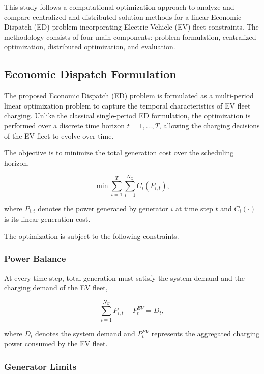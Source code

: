 \documentclass[12pt, a4paper]{article}
\begin{document}
%
This study follows a computational optimization approach to analyze and compare centralized and distributed solution methods for a linear Economic Dispatch (ED) problem incorporating Electric Vehicle (EV) fleet constraints. The methodology consists of four main components: problem formulation, centralized optimization, distributed optimization, and evaluation.

\subsection{Economic Dispatch Formulation}

The proposed Economic Dispatch (ED) problem is formulated as a multi-period linear optimization problem to capture the temporal characteristics of EV fleet charging. Unlike the classical single-period ED formulation, the optimization is performed over a discrete time horizon $t = 1,\ldots,T$, allowing the charging decisions of the EV fleet to evolve over time.

The objective is to minimize the total generation cost over the scheduling horizon,

\begin{equation}
\min \sum_{t=1}^{T}\sum_{i=1}^{N_G} C_i(P_{i,t}),
\end{equation}

where $P_{i,t}$ denotes the power generated by generator $i$ at time step $t$ and $C_i(\cdot)$ is its linear generation cost.

The optimization is subject to the following constraints.

\subsubsection*{Power Balance}

At every time step, total generation must satisfy the system demand and the charging demand of the EV fleet,

\begin{equation}
\sum_{i=1}^{N_G} P_{i,t}
-
P^{EV}_{t}
=
D_t,
\end{equation}

where $D_t$ denotes the system demand and $P^{EV}_{t}$ represents the aggregated charging power consumed by the EV fleet.

\subsubsection*{Generator Limits}
\end{document}
